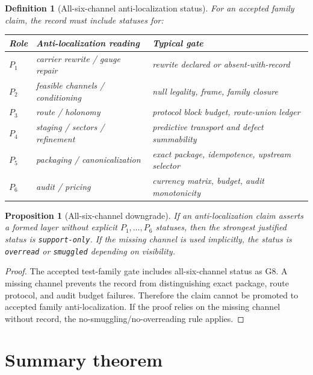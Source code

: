 \documentclass[11pt]{article}
\newtheorem{proposition}{Proposition}
\newtheorem{definition}{Definition}
\begin{document}
\begin{definition}[All-six-channel anti-localization status]
For an accepted family claim, the record must include statuses for:
\begin{center}
\begin{tabular}{lll}
\toprule
Role & Anti-localization reading & Typical gate \\
\midrule
$P_1$ & carrier rewrite / gauge repair & rewrite declared or absent-with-record \\
$P_2$ & feasible channels / conditioning & null legality, frame, family closure \\
$P_3$ & route / holonomy & protocol block budget, route-union ledger \\
$P_4$ & staging / sectors / refinement & predictive transport and defect summability \\
$P_5$ & packaging / canonicalization & exact package, idempotence, upstream selector \\
$P_6$ & audit / pricing & currency matrix, budget, audit monotonicity \\
\bottomrule
\end{tabular}
\end{center}
\end{definition}

\begin{proposition}[All-six-channel downgrade]
If an anti-localization claim asserts a formed layer without explicit $P_1,\dots,P_6$ statuses, then the strongest justified status is \texttt{support-only}.  If the missing channel is used implicitly, the status is \texttt{overread} or \texttt{smuggled} depending on visibility.
\end{proposition}

\begin{proof}
The accepted test-family gate includes all-six-channel status as G8.  A missing channel prevents the record from distinguishing exact package, route protocol, and audit budget failures.  Therefore the claim cannot be promoted to accepted family anti-localization.  If the proof relies on the missing channel without record, the no-smuggling/no-overreading rule applies.
\end{proof}

\section{Summary theorem}
\end{document}
